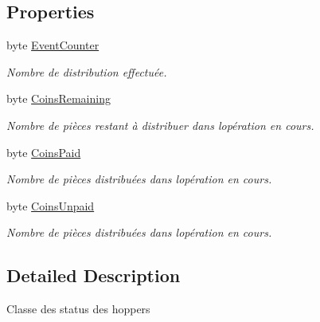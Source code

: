 \subsection*{Properties}
\begin{DoxyCompactItemize}
\item 
byte \mbox{\hyperlink{class_device_library_1_1_c_hopper_1_1_c_hopper_status_ac1a6a71f2f93c75586758b64294f0576}{Event\+Counter}}
\begin{DoxyCompactList}\small\item\em Nombre de distribution effectuée. \end{DoxyCompactList}\item 
byte \mbox{\hyperlink{class_device_library_1_1_c_hopper_1_1_c_hopper_status_ad5afd36f67df7e3028b4d6482ef06fe5}{Coins\+Remaining}}
\begin{DoxyCompactList}\small\item\em Nombre de pièces restant à distribuer dans l\textquotesingle{}opération en cours. \end{DoxyCompactList}\item 
byte \mbox{\hyperlink{class_device_library_1_1_c_hopper_1_1_c_hopper_status_a278b112ef6343808aed31d807aed4e18}{Coins\+Paid}}
\begin{DoxyCompactList}\small\item\em Nombre de pièces distribuées dans l\textquotesingle{}opération en cours. \end{DoxyCompactList}\item 
byte \mbox{\hyperlink{class_device_library_1_1_c_hopper_1_1_c_hopper_status_ab29cd451630d154cc498f86bc2147c48}{Coins\+Unpaid}}
\begin{DoxyCompactList}\small\item\em Nombre de pièces distribuées dans l\textquotesingle{}opération en cours. \end{DoxyCompactList}\end{DoxyCompactItemize}


\subsection{Detailed Description}
Classe des status des hoppers 



